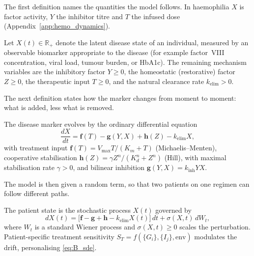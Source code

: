The first definition names the quantities the model follows. In haemophilia
$X$ is factor activity, $Y$ the inhibitor titre and $T$ the infused dose
(Appendix~\ref{app:hemo_dynamics}).

\begin{definition}
\label{def:B_state}
Let $X(t)\in\mathbb{R}_+$ denote the latent disease state of an individual,
measured by an observable biomarker appropriate to the disease (for example
factor~VIII concentration, viral load, tumour burden, or HbA1c). The remaining
mechanism variables are the inhibitory factor $Y\ge0$, the homeostatic
(restorative) factor $Z\ge0$, the therapeutic input $T\ge0$, and the natural
clearance rate $k_{\text{elim}}>0$.
\end{definition}

The next definition states how the marker changes from moment to moment: what
is added, less what is removed.

\begin{definition}
\label{def:B_ode}
The disease marker evolves by the ordinary differential equation \citep{coddington_levinson_1955}
\begin{equation}
\frac{dX}{dt}=\mathbf{f}(T)-\mathbf{g}(Y,X)+\mathbf{h}(Z)-k_{\text{elim}}X,
\label{eq:B_ode}
\end{equation}
with treatment input $\mathbf{f}(T)=V_{\max}T/(K_m+T)$ (Michaelis--Menten),
cooperative stabilisation $\mathbf{h}(Z)=\gamma Z^n/(K_d^n+Z^n)$ (Hill), with
maximal stabilisation rate $\gamma>0$, and bilinear
inhibition $\mathbf{g}(Y,X)=k_{\text{inh}}YX$.
\end{definition}

The model is then given a random term, so that two patients on one regimen can
follow different paths.

\begin{definition}
\label{def:B_sde}
The patient state is the stochastic process $X(t)$ governed by \citep{oksendal_2003}
\begin{equation}
dX(t)=\big[\mathbf{f}-\mathbf{g}+\mathbf{h}-k_{\text{elim}}X(t)\big]\,dt+\sigma(X,t)\,dW_t,
\label{eq:B_sde}
\end{equation}
where $W_t$ is a standard Wiener process \citep{oksendal_2003} and $\sigma(X,t)\ge0$ scales the
perturbation. Patient-specific treatment sensitivity $S_T=f(\{G_i\},\{I_j\},\text{env})$
modulates the drift, personalising \eqref{eq:B_sde}.
\end{definition}

